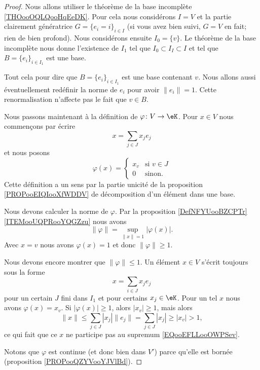 \begin{proof}
	Nous allons utiliser le théorème de la base incomplète \ref{THOooOQLQooHqEeDK}. Pour cela nous considérons \( I=V\) et la partie clairement génératrice \( G=\{ e_i=i \}_{i\in I}\) (si vous avez bien suivi, \( G=V\) en fait; rien de bien profond). Nous considérons ensuite \( I_0=\{ v \}\). Le théorème de la base incomplète nous donne l'existence de \( I_1\) tel que \( I_0\subset I_I\subset I\) et tel que \( B=\{ e_i \}_{i\in I_1}\) est une base.

	Tout cela pour dire que \( B=\{ e_i \}_{i\in I_1}\) est une base contenant \( v\). Nous allons aussi éventuellement redéfinir la norme de \( e_i\) pour avoir \( \| e_i \|=1\). Cette renormalisation n'affecte pas le fait que \( v\in B\).

	Nous passons maintenant à la définition de \( \varphi\colon V\to \eK\). Pour \( x\in V\) nous commençons par écrire
	\begin{equation}
		x=\sum_{j\in J}x_je_j
	\end{equation}
	et nous posons
	\begin{equation}
		\varphi(x)=\begin{cases}
			x_v & \text{si } v\in J \\
			0   & \text{sinon. }
		\end{cases}
	\end{equation}
	Cette définition a un sens par la partie unicité de la proposition \ref{PROPooEIQIooXfWDDV} de décomposition d'un élément dans une base.

	Nous devons calculer la norme de \( \varphi\). Par la proposition \ref{DefNFYUooBZCPTr}\ref{ITEMooUQPRooYQGZzu} nous avons
	\begin{equation}        \label{EQooEFLLooOWPSev}
		\| \varphi \|=\sup_{\| x \|=1}| \varphi(x) |.
	\end{equation}
	Avec \( x=v\) nous avons \( \varphi(x)=1\) et donc \( \| \varphi \|\geq 1\).

	Nous devons encore montrer que \( \| \varphi \|\leq 1\). Un élément \( x\in V\) s'écrit toujours sous la forme
	\begin{equation}
		x=\sum_{i\in J}x_je_j
	\end{equation}
	pour un certain \( J\) fini dans \( I_1\) et pour certains \( x_j\in \eK\). Pour un tel \( x\) nous avons \( \varphi(x)=x_v\). Si \( |\varphi(x)|\geq 1\), alors \( | x_v |\geq 1\), mais alors
	\begin{equation}
		\| x \|\leq \sum_{j\in J}| x_j |\| e_j \|=\sum_{j\in J}| x_j |\geq | x_v |>1,
	\end{equation}
	ce qui fait que ce \( x\) ne participe pas au supremum \eqref{EQooEFLLooOWPSev}.

	Notons que \( \varphi\) est continue (et donc bien dans \( V'\)) parce qu'elle est bornée (proposition \ref{PROPooQZYVooYJVlBd}).
\end{proof}


